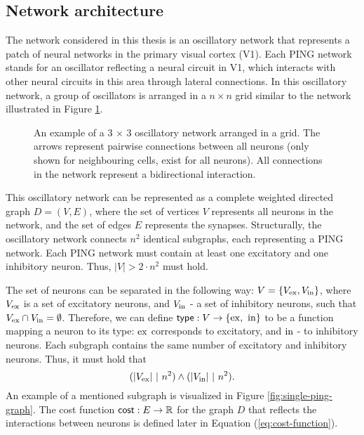 \subsection{Network architecture}
\label{sec:grid-network}

The network considered in this thesis is an oscillatory network that represents a patch of neural networks in the primary visual cortex (V1). Each PING network stands for an oscillator reflecting a neural circuit in V1, which interacts with other neural circuits in this area through lateral connections.
In this oscillatory network, a group of oscillators is arranged in a $n \times n$ grid similar to the network illustrated in Figure \ref{fig:oscillatory-grid-graph}.

\begin{figure}[!htp]
    \centering
    
    \caption[Oscillatory network arranged in a grid]{An example of a 3 $\times$ 3 oscillatory network arranged in a grid. The arrows represent pairwise connections between all neurons (only shown for neighbouring cells, exist for all neurons). All connections in the network represent a bidirectional interaction.}
    \label{fig:oscillatory-grid-graph}
\end{figure}

This oscillatory network can be represented as a complete weighted directed graph $D = (V, E)$, where the set of vertices $V$ represents all neurons in the network, and the set of edges $E$ represents the synapses. Structurally, the oscillatory network connects $n^2$ identical subgraphs, each representing a PING network. Each PING network must contain at least one excitatory and one inhibitory neuron. Thus, $|V| > 2 \cdot n^2$ must hold.

The set of neurons can be separated in the following way: $V = \{ V_{\mathrm{ex}}, V_{\mathrm{in}}\}$, where $V_{\mathrm{ex}}$ is a set of excitatory neurons, and $V_{\mathrm{in}}$ - a set of inhibitory neurons, such that $V_{\mathrm{ex}} \cap V_{\mathrm{in}} = \emptyset$.
Therefore, we can define $\mathsf{type}: V \to \{ \mathrm{ex}, \ \mathrm{in} \}$ to be a function mapping a neuron to its type: $\mathrm{ex}$ corresponds to excitatory, and $\mathrm{in}$ - to inhibitory neurons. Each subgraph contains the same number of excitatory and inhibitory neurons. Thus, it must hold that
\begin{equation}
    (|V_{\mathrm{ex}}| \ | \ n^2) \land (|V_{\mathrm{in}}| \ | \ n^2).
\end{equation}
An example of a mentioned subgraph is visualized in Figure \ref{fig:single-ping-graph}. 
The cost function $\mathsf{cost}: E \to \mathbb{R}$ for the graph $D$ that reflects the interactions between neurons is defined later in Equation (\ref{eq:cost-function}).

